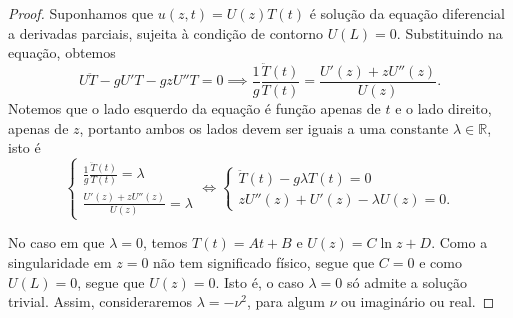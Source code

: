 \begin{proof}
    Suponhamos que \(u(z, t) = U(z) T(t)\) é solução da equação diferencial a derivadas parciais, sujeita à condição de contorno \(U(L) = 0\). Substituindo na equação, obtemos
    \begin{equation*}
        U\ddot{T} - gU'T - gzU''T = 0 \implies \frac1g \frac{\ddot{T}(t)}{T(t)} = \frac{U'(z) + zU''(z)}{U(z)}.
    \end{equation*}
    Notemos que o lado esquerdo da equação é função apenas de \(t\) e o lado direito, apenas de \(z\), portanto ambos os lados devem ser iguais a uma constante \(\lambda \in \mathbb{R}\), isto é
    \begin{equation*}
        \begin{cases}
            \frac{1}{g} \frac{\ddot{T}(t)}{T(t)} = \lambda\\
            \frac{U'(z) + zU''(z)}{U(z)} = \lambda
        \end{cases}
        \iff
        \begin{cases}
            \ddot{T}(t) - g \lambda T(t) = 0\\
            z U''(z) + U'(z) - \lambda U(z) = 0.
        \end{cases}
    \end{equation*}

    No caso em que \(\lambda = 0\), temos \(T(t) = At + B\) e \(U(z) = C \ln{z} + D\). Como a singularidade em \(z = 0\) não tem significado físico, segue que \(C = 0\) e como \(U(L) = 0\), segue que \(U(z) = 0\). Isto é, o caso \(\lambda = 0\) só admite a solução trivial. Assim, consideraremos \(\lambda = - \nu^2\), para algum \(\nu\) ou imaginário ou real.


\end{proof}
